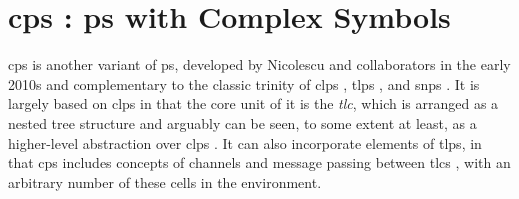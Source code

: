 \section{\label{sec:lr:cpsystems}\texorpdfstring{\gls{cps}}{cP systems} : \texorpdfstring{\gls{ps}}{P systems} with Complex Symbols}



\gls{cps} is another variant of \gls{ps}, developed by Nicolescu and collaborators in the early 2010s \fxerror[inline]{[ref]} and complementary to the classic trinity of \gls{clps} \cite{Paun2000}, \gls{tlps} \cite{Martin-Vide2003}, and \gls{snps} \cite{Ionescu2006}.  It is largely based on \gls{clps} in that the core unit of it is the \emph{\gls{tlc}}, which is arranged as a nested tree structure and arguably can be seen, to some extent at least, as a higher-level abstraction over \gls{clps} \cite{Nicolescu2018}.  It can also incorporate elements of \gls{tlps}, in that \gls{cps} includes concepts of channels and message passing between \glspl{tlc} \cite{Henderson2019}, with an arbitrary number of these cells in the environment.  

